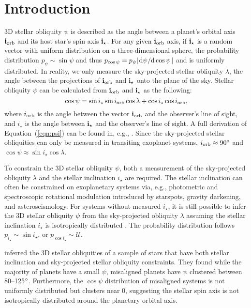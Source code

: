 \documentclass[twocolumn,times]{aastex631}
\begin{document}
\section{Introduction}
\label{sec:intro}

3D stellar obliquity $\psi$ is described as the angle between a planet's orbital axis $\bf{i}_{\rm orb}$ and its host star's spin axis $\bf{i}_{\star}$.
For any given $\bf{i}_{\rm orb}$ axis, if $\bf{i}_{\star}$ is a random vector with uniform distribution on a three-dimensional sphere, the probability distribution $p_{\psi} \sim \sin{\psi}$ and thus $p_{\cos{\psi}} = p_{\psi} \abs{\dv*{\psi}{\cos{\psi}}}$ and is uniformly distributed.
In reality, we only measure the sky-projected stellar obliquity $\lambda$, the angle between the projections of $\bf{i}_{\rm orb}$ and $\bf{i}_{\star}$ onto the plane of the sky. Stellar obliquity $\psi$ can be calculated from $\bf{i}_{\rm orb}$ and $\bf{i}_{\star}$ as the following:
\begin{equation}\label{eqn:psi}
    \cos{\psi} = \sin{i_\star}\sin{i_{\rm orb}}\cos{\lambda} + \cos{i_\star}\cos{i_{\rm orb}},
\end{equation}
where $i_{\rm orb}$ is the angle between the vector $\bf{i}_{\rm orb}$ and the observer's line of sight, and $i_\star$ is the angle between $\bf{i}_{\star}$ and the observer's line of sight. A full derivation of Equation~(\ref{eqn:psi}) can be found in, e.g., \cite{Fabrycky09}.
Since the sky-projected stellar obliquities can only be measured in transiting exoplanet systems, $i_{\rm orb} \approx 90\mbox{$^\circ$}$ and $\cos{\psi} \approx \sin{i_\star}\cos{\lambda}$.

To constrain the 3D stellar obliquity $\psi$, both a measurement of the sky-projected obliquity $\lambda$ and the stellar inclination $i_\star$ are required. The stellar inclination can often be constrained on exoplanetary systems via, e.g., photometric and spectroscopic rotational modulation introduced by starspots, gravity darkening, and asteroseismology. For systems without measured $i_\star$, it is still possible to infer the 3D stellar obliquity $\psi$ from the sky-projected obliquity $\lambda$ assuming the stellar inclination $i_\star$ is isotropically distributed \citep[e.g.,][]{Fabrycky09}. The probability distribution follows $p_{i_\star} \sim \sin{i_{\star}}$, or $p_{\cos{i_\star}} \sim \mathcal{U}$.

\cite{Albrecht21} inferred the 3D stellar obliquities of a sample of stars that have both stellar inclination and sky-projected stellar obliquity constraints. They found while the majority of planets have a small $\psi$, misaligned planets have $\psi$ clustered between 80--125$\mbox{$^\circ$}$. Furthermore, the $\cos{\psi}$ distribution of misaligned systems is not uniformly distributed but clusters near 0, suggesting the stellar spin axis is not isotropically distributed around the planetary orbital axis.
\end{document}

